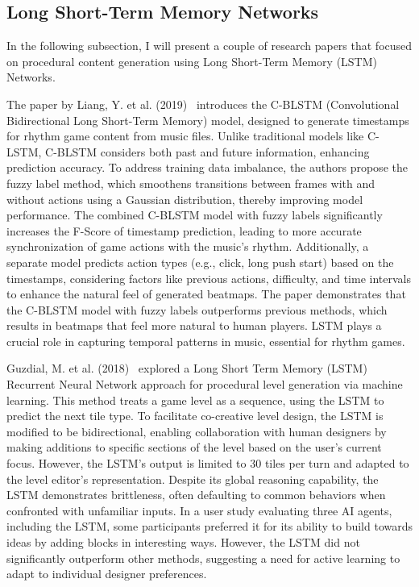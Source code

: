 \documentclass[runningheads]{llncs}
\begin{document}
\subsection{Long Short-Term Memory Networks}
In the following subsection, I will present a couple of research papers that focused on procedural content generation using Long Short-Term Memory (LSTM) Networks.

The paper by Liang, Y. et al. (2019)~\cite{ref_article28} introduces the C-BLSTM (Convolutional Bidirectional Long Short-Term Memory) model, designed to generate timestamps for rhythm game content from music files. Unlike traditional models like C-LSTM, C-BLSTM considers both past and future information, enhancing prediction accuracy. To address training data imbalance, the authors propose the fuzzy label method, which smoothens transitions between frames with and without actions using a Gaussian distribution, thereby improving model performance. The combined C-BLSTM model with fuzzy labels significantly increases the F-Score of timestamp prediction, leading to more accurate synchronization of game actions with the music's rhythm. Additionally, a separate model predicts action types (e.g., click, long push start) based on the timestamps, considering factors like previous actions, difficulty, and time intervals to enhance the natural feel of generated beatmaps. The paper demonstrates that the C-BLSTM model with fuzzy labels outperforms previous methods, which results in beatmaps that feel more natural to human players. LSTM plays a crucial role in capturing temporal patterns in music, essential for rhythm games.

Guzdial, M. et al. (2018)~\cite{ref_article12} explored a Long Short Term Memory (LSTM) Recurrent Neural Network approach for procedural level generation via machine learning. This method treats a game level as a sequence, using the LSTM to predict the next tile type. To facilitate co-creative level design, the LSTM is modified to be bidirectional, enabling collaboration with human designers by making additions to specific sections of the level based on the user's current focus. However, the LSTM's output is limited to 30 tiles per turn and adapted to the level editor's representation. Despite its global reasoning capability, the LSTM demonstrates brittleness, often defaulting to common behaviors when confronted with unfamiliar inputs. In a user study evaluating three AI agents, including the LSTM, some participants preferred it for its ability to build towards ideas by adding blocks in interesting ways. However, the LSTM did not significantly outperform other methods, suggesting a need for active learning to adapt to individual designer preferences.
\end{document}
